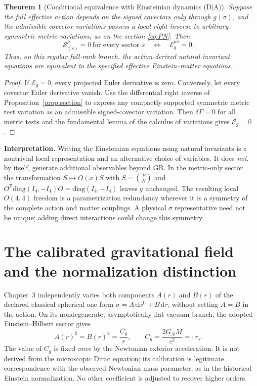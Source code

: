 \documentclass[11pt,a4paper]{article}
\newtheorem{theorem}{Theorem}[section]
\newcommand{\dd}{\mathrm d}
\newcommand{\cE}{\mathcal E}
\newcommand{\cS}{\mathscr S}
\begin{document}
\begin{theorem}[Conditional equivalence with Einsteinian dynamics (D$\mid$A)]
\label{thm:equiv}
Suppose the full effective action depends on the signed covectors
\emph{only through} $g(\sigma)$, and the admissible covector
variations possess a local right inverse to arbitrary symmetric
metric variations, as on the section \eqref{eq:PN}. Then
\begin{equation}\label{eq:equivalence}
\boxed{\cS_{(s)}^\rho=0\ \text{for every sector }s
\quad\Longleftrightarrow\quad
\cE_g^{\mu\nu}=0.}
\end{equation}
Thus, on this regular full-rank branch, the action-derived
natural-invariant equations are equivalent to the \emph{specified}
effective Einstein--matter equations.
\end{theorem}
\begin{proof}
If $\cE_g=0$, every projected Euler derivative is zero.
Conversely, let every covector Euler derivative vanish.
Use the differential right inverse of Proposition~\ref{prop:section}
to express any compactly supported symmetric metric test variation
as an admissible signed-covector variation. Then
$\delta\Gamma=0$ for all metric tests and the fundamental lemma
of the calculus of variations gives $\cE_g=0$.
\end{proof}

\noindent\textbf{Interpretation.}
Writing the Einsteinian equations using natural invariants is a
nontrivial local representation and an alternative choice of variables.
It does \emph{not}, by itself, generate additional observables beyond
GR. In the metric-only sector the transformation
$S\mapsto O(x)S$ with $S=\binom{P}{N}$ and
$O^{\mathsf T}\mathrm{diag}(I_4,-I_4)O=\mathrm{diag}(I_4,-I_4)$
leaves $g$ unchanged. The resulting local $O(4,4)$ freedom is a
parametrization redundancy wherever it is a symmetry of the complete
action and matter couplings. A physical $\sigma$ representative need
not be unique; adding direct interactions could change this symmetry.

\section{The calibrated gravitational field and the normalization distinction}
\label{sec:connection}
Chapter~3 independently varies both components $A(r)$ and $B(r)$ of
the declared classical spherical one-form $\sigma=A\,\dd x^0+B\,\dd r$,
without setting $A=B$ in the action. On its nondegenerate, asymptotically
flat vacuum branch, the adopted Einstein--Hilbert sector gives
\begin{equation}\label{eq:classical}
\boxed{\displaystyle A(r)^2=B(r)^2=\frac{C_g}{r},\qquad
 C_g=\frac{2G_NM}{c^2}=:r_s.}
\end{equation}
The value of $C_g$ is fixed \emph{once} by the Newtonian exterior
acceleration. It is not derived from the microscopic Dirac equation;
its calibration is legitimate correspondence with the observed
Newtonian mass parameter, as in the historical Einstein normalization.
No other coefficient is adjusted to recover higher orders.
\end{document}
